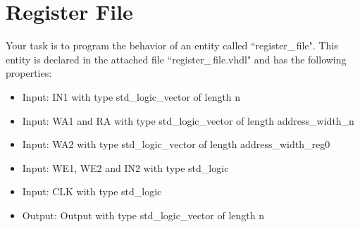 \documentclass[a4paper,12pt]{article}
\begin{document}
\pagestyle{empty}
\setlength{\parindent}{0em}
\section*{Register File}

Your task is to program the behavior of an entity called ``register\_\,file". This entity is declared in the attached file ``register\_\,file.vhdl" and has the following properties:
\begin{itemize}
\item Input:  IN1 with type std\_logic\_vector  of length {{n}}
\item Input:  WA1 and RA with type std\_logic\_vector of length {{address_width_n}}

\item Input:  WA2 with type std\_logic\_vector of length {{address_width_reg0}}


\item Input:  WE1, WE2 and IN2 with type std\_logic

\item Input:  CLK with type std\_logic


\item Output: Output with type std\_logic\_vector of length {{n}}
\end{itemize}
\end{document}
